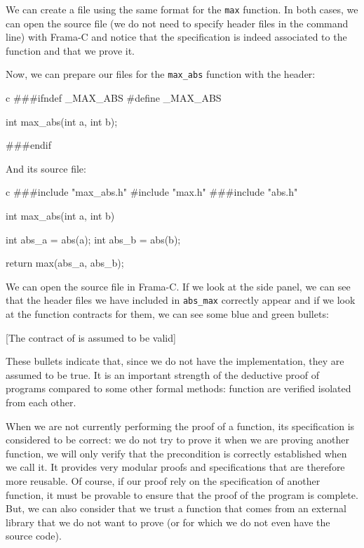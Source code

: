 We can create a file using the same format for the \texttt{max}
function. In both cases, we can open the source file (we do not need to
specify header files in the command line) with Frama-C and notice that
the specification is indeed associated to the function and that we prove
it.


Now, we can prepare our files for the \texttt{max\_abs} function with
the header:


\begin{CodeBlock}{c}
###ifndef _MAX_ABS
#define _MAX_ABS

int max_abs(int a, int b);

###endif
\end{CodeBlock}



And its source file:



\begin{CodeBlock}{c}
###include "max_abs.h"
#include "max.h"
###include "abs.h"

int max_abs(int a, int b){
  int abs_a = abs(a);
  int abs_b = abs(b);

  return max(abs_a, abs_b);
}
\end{CodeBlock}



We can open the source file in Frama-C. If we look at the side panel, we
can see that the header files we have included in \texttt{abs\_max}
correctly appear and if we look at the function contracts for them, we
can see some blue and green bullets:



[The contract of  is assumed to be valid]


These bullets indicate that, since we do not have the implementation,
they are assumed to be true. It is an important strength of the
deductive proof of programs compared to some other formal methods:
function are verified isolated from each other.

When we are not currently performing the proof of a function, its
specification is considered to be correct: we do not try to prove it
when we are proving another function, we will only verify that the
precondition is correctly established when we call it. It provides very
modular proofs and specifications that are therefore more reusable. Of
course, if our proof rely on the specification of another function, it
must be provable to ensure that the proof of the program is complete.
But, we can also consider that we trust a function that comes from an
external library that we do not want to prove (or for which we do not
even have the source code).

